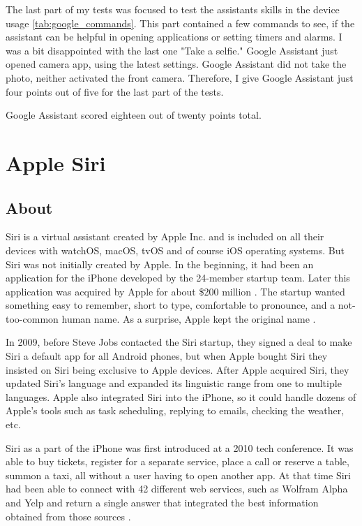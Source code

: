 \documentclass[
  digital, %
  oneside, %
  table,   %
  lof,     %
  lot,     %
]{fithesis3}
\begin{document}
The last part of my tests was focused to test the assistants skills in the device usage \ref{tab:google_commands}. This part contained a few commands to see, if the assistant can be helpful in opening applications or setting timers and alarms. I was a bit disappointed with the last one "Take a selfie." Google Assistant just opened camera app, using the latest settings. Google Assistant did not take the photo, neither activated the front camera. Therefore, I give Google Assistant just four points out of five for the last part of the tests.

Google Assistant scored eighteen out of twenty points total.

\chapter{Apple Siri}\label{ch:siri}
\section{About}
Siri is a virtual assistant created by Apple Inc. and is included on all their devices with watchOS, macOS, tvOS and of course iOS operating systems. But Siri was not initially created by Apple. In the beginning, it had been an application for the iPhone developed by the 24-member startup team. Later this application was acquired by Apple for about \$200 million \parencite{siri_buy}. The startup wanted something easy to remember, short to type, comfortable to pronounce, and a not-too-common human name. As a surprise, Apple kept the original name \parencite{siri_name}.

In 2009, before Steve Jobs contacted the Siri startup, they signed a deal to make Siri a default app for all Android phones, but when Apple bought Siri they insisted on Siri being exclusive to Apple devices. After Apple acquired Siri, they updated Siri's language and expanded its linguistic range from one to multiple languages. Apple also integrated Siri into the iPhone, so it could handle dozens of Apple's tools such as task scheduling, replying to emails, checking the weather, etc.

Siri as a part of the iPhone was first introduced at a 2010 tech conference. It was able to buy tickets, register for a separate service, place a call or reserve a table, summon a taxi, all without a user having to open another app. At that time Siri had been able to connect with 42 different web services, such as Wolfram Alpha and Yelp and return a single answer that integrated the best information obtained from those sources \parencite{siri_rising}.
\end{document}
